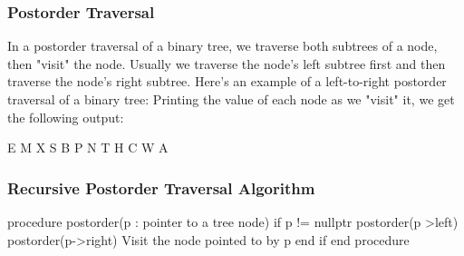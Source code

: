 \documentclass{report}
\begin{document}
    \subsubsection{Postorder Traversal}
    \bigbreak \noindent 
    In a postorder traversal of a binary tree, we traverse both subtrees of a node, then "visit" the node. Usually we traverse the node's left subtree first and then traverse the node's right subtree.
    \bigbreak \noindent 
    Here's an example of a left-to-right postorder traversal of a binary tree:
    \bigbreak \noindent 
    \bigbreak \noindent 
    Printing the value of each node as we "visit" it, we get the following output:
    \bigbreak \noindent 
    \begin{center}
        E M X S B P N T H C W A
    \end{center}
    \bigbreak \noindent 
    \bigbreak \noindent 
    \subsubsection{Recursive Postorder Traversal Algorithm}
    \bigbreak \noindent 
    \begin{cppcode}
    procedure postorder(p : pointer to a tree node)
        if p != nullptr
            postorder(p >left)
            postorder(p->right)
            Visit the node pointed to by p
        end if
    end procedure
    \end{cppcode}

    \bigbreak \noindent 
\end{document}

